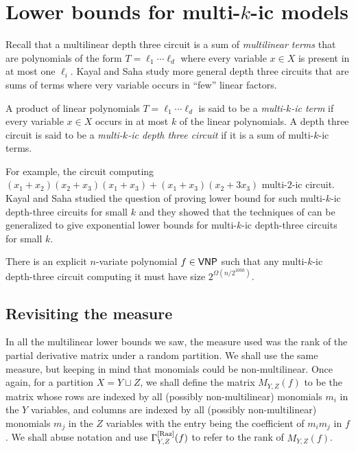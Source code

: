 \chapter{Lower bounds for multi-$k$-ic models}\label{chap:multi-k-ic}

Recall that a multilinear depth three circuit is a sum of \emph{multilinear terms} that are polynomials of the form $T = \ell_1 \cdots \ell_d$ where every variable $x \in X$ is present in at most one $\ell_i$.
Kayal and Saha \cite{ks15} study more general depth three circuits that are sums of terms where very variable occurs in ``few'' linear factors.

\begin{definition}
  A product of linear polynomials $T = \ell_1 \cdots \ell_d$ is said to be a \emph{multi-$k$-ic term} if every variable $x \in X$ occurs in at most $k$ of the linear polynomials.
A depth three circuit is said to be a \emph{multi-$k$-ic depth three circuit} if it is a sum of multi-$k$-ic terms.
\end{definition}

For example, the circuit computing $(x_1 + x_2)(x_2 + x_3)(x_1 +x_3) + (x_1 + x_3)(x_2 + 3x_3)$ multi-$2$-ic circuit. \\

Kayal and Saha \cite{ks15} studied the question of proving lower bound for such multi-$k$-ic depth-three circuits for small $k$ and they showed that the techniques of \cite{raz2004} can be generalized to give exponential lower bounds for multi-$k$-ic depth-three circuits for small $k$.

\begin{theorem}[\cite{ks15}]\label{thm:multi-k-ic} There is an explicit $n$-variate polynomial $f \in \mathsf{VNP}$ such that any multi-$k$-ic depth-three circuit computing it must have size $2^{\Omega(n/2^{100k})}$.
\end{theorem}

\section{Revisiting the measure}

In all the multilinear lower bounds we saw, the measure used was the rank of the partial derivative matrix under a random partition.
We shall use the same measure, but keeping in mind that monomials could be non-multilinear.
Once again, for a partition $X = Y \sqcup Z$, we shall define the matrix $M_{Y,Z}(f)$ to be the matrix whose rows are indexed by all (possibly non-multilinear) monomials $m_i$ in the $Y$ variables, and columns are indexed by all (possibly non-multilinear) monomials $m_j$ in the $Z$ variables with the entry being the coefficient of $m_i m_j$ in $f$.
We shall abuse notation and use $\Gamma^{\mathrm{[Raz]}}_{Y,Z}(f)$ to refer to the rank of $M_{Y,Z}(f)$.

